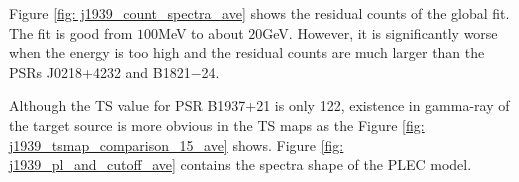 \documentclass[a4paper, 12pt]{report}
\begin{document}
        \begin{table}[!ht]
          \centering
            \caption[Fit parameters of the spectra model of PSR B1937+21.]
              {Fit parameters of the spectra model of PSR B1937+21. 
              The names of parameters are consistent with Equation
              \ref{eq: fermi_model}. The old results are reported by
              \cite{0004-637X-787-2-167} Note that since the paper prefers power-law model 
              than PLEC model, it does not report the photon flux of PLEC model.}
            \label{table: j1939_fit_result_ave}        
        \end{table} 

        Figure \ref{fig: j1939_count_spectra_ave} shows the residual counts of the global fit.
        The fit is good from $100$MeV to about $20$GeV. However, it is significantly worse 
        when the energy is too high and the residual counts are much larger than the PSRs 
        J0218+4232 and B1821$-$24.

        Although the TS value for PSR B1937+21 is only 122, existence in gamma-ray of the 
        target source is more obvious in the TS maps as the Figure 
        \ref{fig: j1939_tsmap_comparison_15_ave} shows. Figure 
        \ref{fig: j1939_pl_and_cutoff_ave} contains the spectra shape of the PLEC model. 
\end{document}
